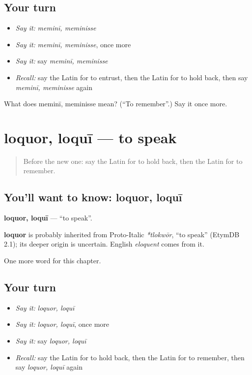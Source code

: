 \subsection*{Your turn}
\begin{itemize}
\raggedright
  \item \emph{Say it:} \emph{meminī, meminisse}
  \item \emph{Say it:} \emph{meminī, meminisse}, once more
  \item \emph{Say it:} say \emph{meminī, meminisse}
  \item \emph{Recall:} say the Latin for to entrust, then the Latin for to hold back, then say \emph{meminī, meminisse} again
\end{itemize}

\begin{tcolorbox}[breakable,colback=teal!4,colframe=teal!35!black,title={Before you move on}]
What does meminī, meminisse mean? (\textquotedblleft{}To remember\textquotedblright{}.) Say it once more.
\end{tcolorbox}
\section[loquor, loquī]{loquor, loquī — to speak}

\label{lesson:LA-C235-loquor}



\begin{quote}
Before the new one: say the Latin for to hold back, then the Latin for to remember.
\end{quote}

\subsection*{You'll want to know: loquor, loquī}
\textbf{loquor, loquī} — \textquotedblleft{}to speak\textquotedblright{}.

\begin{cousinweb}
\textbf{loquor} is probably inherited from Proto-Italic \emph{*tlokwōr}, \textquotedblleft{}to speak\textquotedblright{} (EtymDB 2.1); its deeper origin is uncertain. English \emph{eloquent} comes from it.
\end{cousinweb}

\begin{grammarlens}[title={What you've built}]
One more word for this chapter.
\end{grammarlens}

\subsection*{Your turn}
\begin{itemize}
\raggedright
  \item \emph{Say it:} \emph{loquor, loquī}
  \item \emph{Say it:} \emph{loquor, loquī}, once more
  \item \emph{Say it:} say \emph{loquor, loquī}
  \item \emph{Recall:} say the Latin for to hold back, then the Latin for to remember, then say \emph{loquor, loquī} again
\end{itemize}

